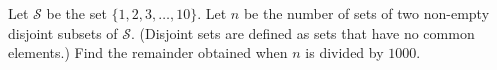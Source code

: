 Let $\mathcal{S}$ be the set $\{1,2,3,\ldots,10\}.$ Let $n$ be the number of sets of two non-empty disjoint subsets of $\mathcal{S}.$ (Disjoint sets are defined as sets that have no common elements.) Find the remainder obtained when $n$ is divided by $1000.$